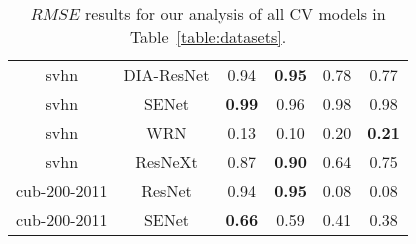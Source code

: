\begin{table}[t]
\begin{center}
\begin{tabular}{|c|c|c|c|c|c|}
 svhn & DIA-ResNet  & 0.94 &  \textbf{0.95} & 0.78 & 0.77 \\
 svhn & SENet  & \textbf{0.99} &  0.96 & 0.98 & 0.98 \\
 svhn & WRN  & 0.13 &  0.10 & 0.20 & \textbf{0.21} \\
 svhn & ResNeXt  & 0.87 &  \textbf{0.90} & 0.64 & 0.75 \\
\hline
 cub-200-2011 & ResNet  & 0.94 &  \textbf{0.95} & 0.08 & 0.08 \\
 cub-200-2011 & SENet  & \textbf{0.66} &  0.59 & 0.41 & 0.38 \\
\hline
\end{tabular}
\end{center}
\vspace{-5mm}
\caption{$RMSE$ results for our analysis of all CV models in Table~\ref{table:datasets}. }
\label{table:MSEresults}
\end{table}


